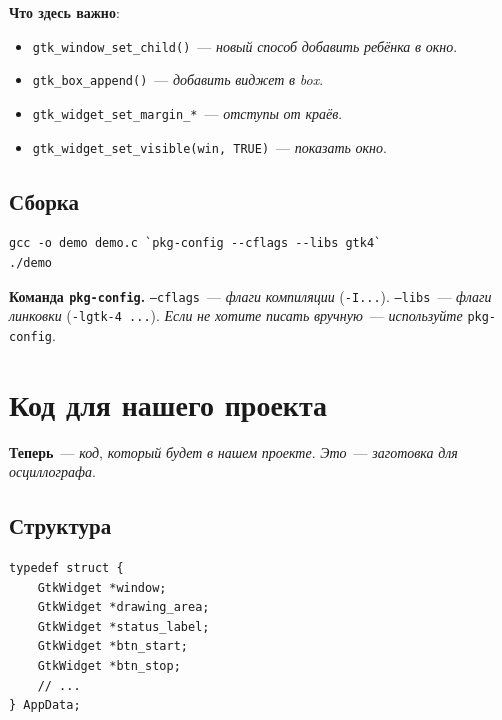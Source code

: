 \textbf{Что здесь важно}:
\begin{itemize}
    \item \texttt{gtk\_window\_set\_child()}~--- \emph{новый}
          \emph{способ} \emph{добавить} \emph{ребёнка}
          \emph{в} \emph{окно}.
    \item \texttt{gtk\_box\_append()}~--- \emph{добавить}
          \emph{виджет} \emph{в} \emph{box}.
    \item \texttt{gtk\_widget\_set\_margin\_*}~--- \emph{отступы}
          \emph{от} \emph{краёв}.
    \item \texttt{gtk\_widget\_set\_visible(win, TRUE)}~---
          \emph{показать} \emph{окно}.
\end{itemize}

\subsection{Сборка}

\begin{listing}[htbp]
\begin{verbatim}
gcc -o demo demo.c `pkg-config --cflags --libs gtk4`
./demo
\end{verbatim}
\caption{Компиляция и запуск}
\label{lst:gtk4-build}
\end{listing}

\begin{keybox}
\textbf{Команда \texttt{pkg-config}.} \texttt{--cflags}~---
\emph{флаги} \emph{компиляции} (\texttt{-I...}). \texttt{--libs}~---
\emph{флаги} \emph{линковки} (\texttt{-lgtk-4 ...}). \emph{Если}
\emph{не} \emph{хотите} \emph{писать} \emph{вручную}~---
\emph{используйте} \texttt{pkg-config}.
\end{keybox}

\section{Код для нашего проекта}
\label{sec:gtk4-project}

\textbf{Теперь}~--- \emph{код}, \emph{который} \emph{будет}
\emph{в} \emph{нашем} \emph{проекте}. \emph{Это}~---
\emph{заготовка} \emph{для} \emph{осциллографа}.

\subsection{Структура}

\begin{listing}[htbp]
\begin{verbatim}
typedef struct {
    GtkWidget *window;
    GtkWidget *drawing_area;
    GtkWidget *status_label;
    GtkWidget *btn_start;
    GtkWidget *btn_stop;
    // ...
} AppData;
\end{verbatim}
\caption{Структура \texttt{AppData}}
\label{lst:gtk4-appdata}
\end{listing}

